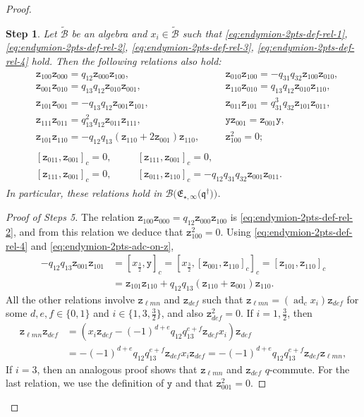 \documentclass[pdftex]{sigma}
\numberwithin{equation}{section}
\newtheorem{stepi}{Step}
\newcommand{\adc}{\operatorname{ad}_c}
\newcommand{\toba}{\mathscr B}
\newcommand{\wtoba}{\widetilde{\mathscr B}}
\newcommand{\yt}{\mathtt{y}}
\newcommand{\zt}{\mathtt{z}}
\newcommand{\eny}{\mathfrak{E}}
\newcommand{\enyIIb}[1]{\eny_{\star,#1}}
\newcommand{\bq}{\mathfrak{q}}
\newcommand{\bqs}{\bq^{\dagger}}
\newcommand{\tresdos}{\frac{3}{2}}
\begin{document}
\begin{proof}
\begin{stepi}\label{lem:endymion-2pts-rels-other-1}
Let $\wtoba$ be an algebra and $x_i\in\wtoba$ such that \eqref{eq:endymion-2pts-def-rel-1}, \eqref{eq:endymion-2pts-def-rel-2}, \eqref{eq:endymion-2pts-def-rel-3}, \eqref{eq:endymion-2pts-def-rel-4} hold. Then the following relations also hold:
\begin{gather}\label{eq:q-commut-zs}
\begin{aligned}
&\zt_{100}\zt_{000}=q_{12}\zt_{000}\zt_{100},&&
\zt_{010}\zt_{100} = -q_{31}q_{32}\zt_{100}\zt_{010},
\\
&\zt_{001}\zt_{010} = q_{13}q_{12}\zt_{010}\zt_{001},&&
\zt_{110}\zt_{010} = q_{13}q_{12}\zt_{010}\zt_{110},
\\
&\zt_{101}\zt_{001} = -q_{13}q_{12}\zt_{001}\zt_{101},&&
\zt_{011}\zt_{101} = q_{31}^3q_{32}\zt_{101}\zt_{011},
\\
&\zt_{111}\zt_{011} = q_{13}^2q_{12}\zt_{011}\zt_{111},&&
\yt\zt_{001} = \zt_{001}\yt,
\\
&\zt_{101}\zt_{110} = -q_{12}q_{13}(\zt_{110}+2\zt_{001})\zt_{110},\quad&&
\zt_{100}^2=0;
\end{aligned}
\\ \label{eq:rels-zs}
\begin{aligned}
& [\zt_{011},\zt_{001}]_c=0,\quad&&
[\zt_{111},\zt_{001}]_c=0,
\\
&[\zt_{111},\zt_{001}]_c=0,&&
[\zt_{011},\zt_{110}]_c =-q_{12}q_{31}q_{32}\zt_{001}\zt_{011}.
\end{aligned}
\end{gather}
In particular, these relations hold in $\toba\big(\enyIIb{\infty}\big(\bqs\big) \big)$.
\end{stepi}

\begin{proof}[Proof of Steps 5]
The relation $\zt_{100}\zt_{000}=q_{12}\zt_{000}\zt_{100}$ is \eqref{eq:endymion-2pts-def-rel-2}, and from this relation we deduce that $\zt_{100}^2=0$. Using \eqref{eq:endymion-2pts-def-rel-4} and \eqref{eq:endymion-2pts-adc-on-z},
\begin{align*}
-q_{12}q_{13}\zt_{001}\zt_{101} &= [x_{\tresdos}, \yt]_c = [x_{\tresdos}, [\zt_{001}, \zt_{110}]_c]_c
= [\zt_{101}, \zt_{110}]_c
\\
&= \zt_{101}\zt_{110}+ q_{12}q_{13}(\zt_{110}+\zt_{001})\zt_{110}.
\end{align*}
All the other relations involve $\zt_{\ell mn}$ and $\zt_{def}$ such that $\zt_{\ell mn}=(\adc x_i)\zt_{def}$ for some $d,e,f\in\{0,1\}$ and $i\in\big\{1,3,\tresdos\big\}$, and also $\zt_{def}^2=0$. If $i=1,\tresdos$, then
\begin{align*}
\zt_{\ell mn}\zt_{def} &= (x_i\zt_{def}-(-1)^{d+e}q_{12}q_{13}^{e+f}\zt_{def}x_i) \zt_{def}
\\
&= -(-1)^{d+e}q_{12}q_{13}^{e+f}\zt_{def}x_i\zt_{def}
= -(-1)^{d+e}q_{12}q_{13}^{e+f}\zt_{def}\zt_{\ell mn},
\end{align*}
If $i=3$, then an analogous proof shows that $\zt_{\ell mn}$ and $\zt_{def}$ $q$-commute. For the last relation, we use the definition of $\yt$ and that $\zt_{001}^2=0$.



\end{proof}
\end{proof}
\end{document}
